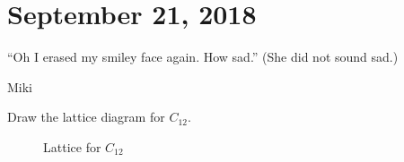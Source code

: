 \section{September 21, 2018}

\epigraph{``Oh I erased my smiley face again. How sad.'' (She did not sound sad.)}{Miki}

\begin{problem}[Warm up]
Draw the lattice diagram for $C_{12}$.
\end{problem}

\begin{figure}[h]
	\begin{center}
	\end{center}
	\caption{Lattice for $C_{12}$}
\end{figure}